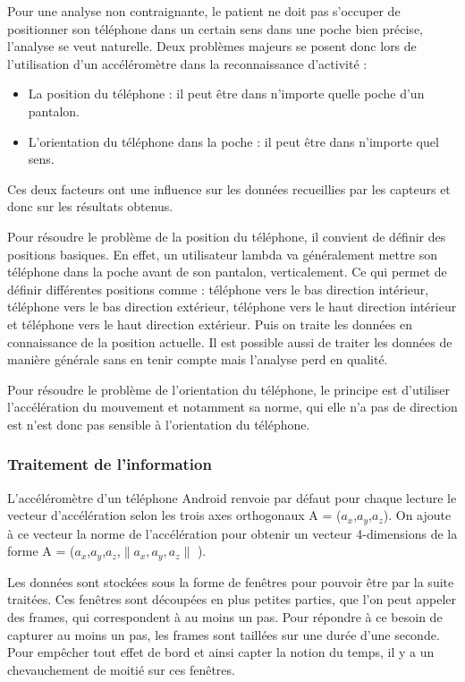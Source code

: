 \documentclass{article}
\begin{document}
Pour une analyse non contraignante, le patient ne doit pas s'occuper de positionner son téléphone dans un certain sens dans une poche bien précise, l'analyse se veut naturelle. \newline
Deux problèmes majeurs se posent donc lors de l'utilisation d'un accéléromètre dans la reconnaissance d'activité : 
\begin{itemize}
    \item La position du téléphone : il peut être dans n'importe quelle poche d'un pantalon.
    \item L'orientation du téléphone dans la poche : il peut être dans n'importe quel sens.
\end{itemize}
Ces deux facteurs ont une influence sur les données recueillies par les capteurs et donc sur les résultats obtenus.

Pour résoudre le problème de la position du téléphone, il convient de définir des positions basiques. En effet, un utilisateur lambda va généralement mettre son téléphone dans la poche avant de son pantalon, verticalement. Ce qui permet de définir différentes positions comme : téléphone vers le bas direction intérieur, téléphone vers le bas direction extérieur, téléphone vers le haut direction intérieur et téléphone vers le haut direction extérieur. 
Puis on traite les données en connaissance de la position actuelle. Il est possible aussi de traiter les données de manière générale sans en tenir compte mais l'analyse perd en qualité.

Pour résoudre le problème de l'orientation du téléphone, le principe est d'utiliser l'accélération du mouvement et notamment sa norme, qui elle n'a pas de direction est n'est donc pas sensible à l'orientation du téléphone. 

\subsubsection{Traitement de l'information}

L'accéléromètre d'un téléphone Android renvoie par défaut pour chaque lecture le vecteur d'accélération selon les trois axes orthogonaux A = ($a_{x}$,$a_{y}$,$a_{z}$). \cite{Motionsensors} 
On ajoute à ce vecteur la norme de l'accélération pour obtenir un vecteur 4-dimensions de la forme A = ($a_{x}$,$a_{y}$,$a_{z}$,$\| $$a_{x}$$,$$a_{y}$$,$$a_{z}$$\|$ ).

Les données sont stockées sous la forme de fenêtres pour pouvoir être par la suite traitées. Ces fenêtres sont découpées en plus petites parties, que l'on peut appeler des frames, qui correspondent à au moins un pas. Pour répondre à ce besoin de capturer au moins un pas, les frames sont taillées sur une durée d'une seconde. Pour empêcher tout effet de bord et ainsi capter la notion du temps, il y a un chevauchement de moitié sur ces fenêtres. 
\end{document}
